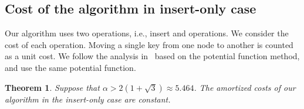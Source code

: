 \documentclass[a4paper]{article}
\newtheorem{theorem}{Theorem}
\begin{document}
\subsection{Cost of the algorithm in insert-only case}
\label{sect:imbalanceratioproof}

Our algorithm uses two operations, i.e., insert and {\minbalance} operations.
 We consider the cost of each operation. Moving a single
key from one node to another is counted as a unit cost.  We follow the
analysis in~\cite{GanesanBGM04-vldb} based on the potential function
method, and use the same potential function.

\begin{theorem}\label{thm:amortized_cost_insertonly}
   Suppose that $\alpha>2(1+\sqrt{3})\approx 5.464$. The amortized costs of our algorithm in the insert-only case are
  constant.
\end{theorem}
\end{document}
